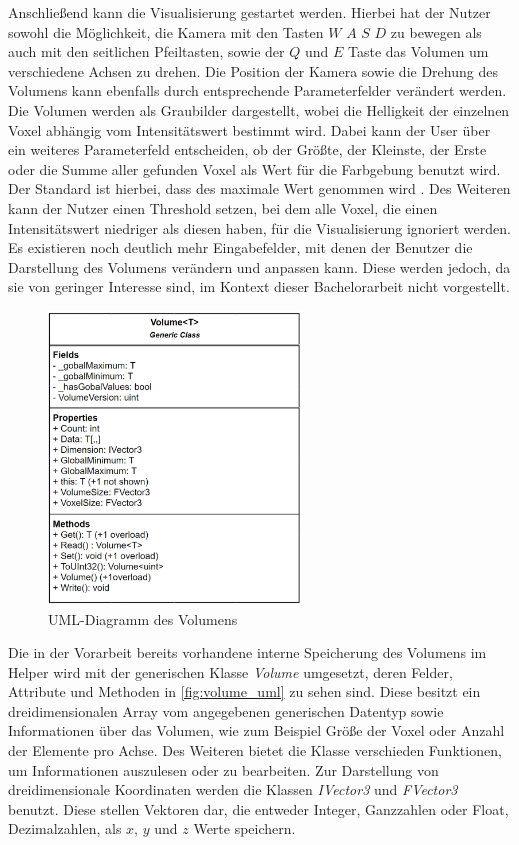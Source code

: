 Anschließend kann die Visualisierung gestartet werden. Hierbei hat der Nutzer sowohl die Möglichkeit, die Kamera mit den Tasten $W$ $A$ $S$ $D$ zu bewegen als auch mit den seitlichen Pfeiltasten, sowie der $Q$ und $E$ Taste das Volumen um verschiedene Achsen zu drehen. Die Position der Kamera sowie die Drehung des Volumens kann ebenfalls durch entsprechende Parameterfelder verändert werden.
Die Volumen werden als Graubilder dargestellt, wobei die Helligkeit der einzelnen Voxel abhängig vom Intensitätswert bestimmt wird. Dabei kann der User über ein weiteres Parameterfeld entscheiden, ob der Größte, der Kleinste, der Erste oder die Summe aller gefunden Voxel als Wert für die Farbgebung benutzt wird. Der Standard ist hierbei, dass des maximale Wert genommen wird .
\newline
Des Weiteren kann der Nutzer einen Threshold setzen, bei dem alle Voxel, die einen Intensitätswert niedriger als diesen haben, für die Visualisierung ignoriert werden.
Es existieren noch deutlich mehr Eingabefelder, mit denen der Benutzer die Darstellung des Volumens verändern und anpassen kann. Diese werden jedoch, da sie von geringer Interesse sind, im Kontext dieser Bachelorarbeit nicht vorgestellt.


\begin{figure}
\centering
\includegraphics[width=0.6\textwidth]{Logos/Volume_UML.PNG}
\caption{UML-Diagramm des Volumens} 
\label{fig:volume_uml} 
\end{figure}


Die in der Vorarbeit bereits vorhandene interne Speicherung des Volumens im Helper wird mit der generischen Klasse \textit{Volume} umgesetzt, deren Felder, Attribute und Methoden in \autoref{fig:volume_uml} zu sehen sind. Diese besitzt ein dreidimensionalen Array vom angegebenen generischen Datentyp sowie Informationen über das Volumen, wie zum Beispiel Größe der Voxel oder Anzahl der Elemente pro Achse.
Des Weiteren bietet die Klasse verschieden Funktionen, um Informationen auszulesen oder zu bearbeiten. Zur Darstellung von dreidimensionale Koordinaten werden die Klassen \textit{IVector3} und \textit{FVector3} benutzt. Diese stellen Vektoren dar, die entweder Integer, Ganzzahlen oder Float, Dezimalzahlen, als $x$, $y$ und $z$ Werte speichern.


